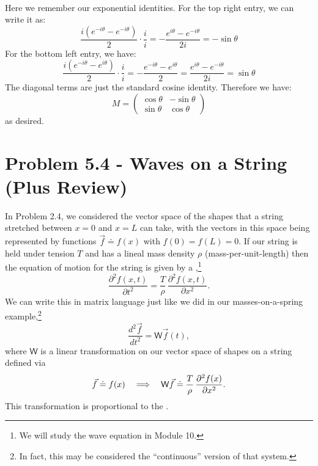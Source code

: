 \documentclass{article}
\begin{document}
\begin{solution}
\begin{align*}
	\end{align*}
	Here we remember our exponential identities. For the top right entry, we can write it as:
	\[
		\frac{i(e^{- i \theta} - e^{- i \theta})}{2} \cdot \frac{i}{i} = -\frac{e^{i \theta} - e^{- i \theta}}{2i}
		 = - \sin \theta 
	\] 
	For the bottom left entry, we have:
	\[
		\frac{i(e^{- i \theta} - e^{i \theta})}{2} \cdot \frac{i}{i} = -\frac{e^{-i \theta} - e^{i \theta}}{2}
		= \frac{e^{i \theta} - e^{- i \theta}}{2i} = \sin \theta 
	\] 
	The diagonal terms are just the standard cosine identity. Therefore we have:
	\[
		M = \begin{pmatrix} \cos \theta & - \sin \theta\\ \sin \theta & \cos \theta  \end{pmatrix} 
	\] 
	as desired.
\end{solution}

\bigskip
\dphline
\pagebreak
\section*{Problem 5.4 - Waves on a String (Plus Review)}

In Problem 2.4, we considered the vector space of the shapes that a string stretched between $x=0$ and $x=L$ can take, with the vectors in this space
being represented by functions $\vec{f} \doteq f(x)$ with $f(0)=f(L)=0$.  If our string is held under tension $T$ and has a lineal mass density $\rho$ (mass-per-unit-length) then
the equation of motion for the string is given by a ,\footnote{We will study the wave equation in Module 10.}
	\begin{equation}
		\frac{\partial^{2}f(x,t)}{\partial t^{2}} = \frac{T}{\rho}\,\frac{\partial^{2}f(x,t)}{\partial x^{2}}.
	\label{waveequation}
	\end{equation}
We can write this in matrix language just like we did in our masses-on-a-spring example,\footnote{In fact, this may be considered the ``continuous'' version of that
system.}
	\begin{equation*}
		\frac{d^{2}{\vec{f}}}{dt^{2}} = \mathsf{W}\vec{f}(t),
	\end{equation*}
where $\mathsf{W}$ is a linear transformation on our vector space of shapes on a string defined via
	\begin{equation*}
		\vec{f} \doteq	f(x)	\quad \Longrightarrow \quad \mathsf{W}\vec{f} \doteq \frac{T}{\rho}\,\frac{\partial^{2}f(x)}{\partial x^{2}}.
	\end{equation*}
This transformation is proportional to the .
\end{document}
